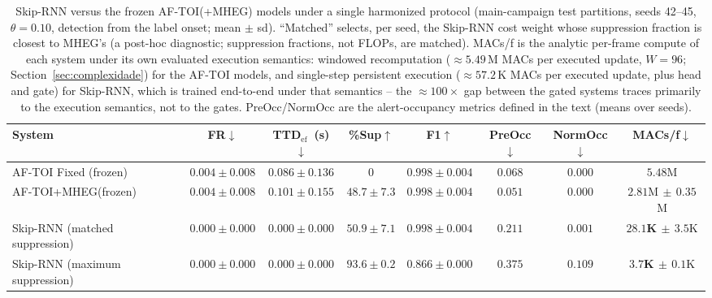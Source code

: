 \documentclass[a4paper,fleqn]{cas-dc}
\newcommand{\MHEG}{\mbox{MHEG}\xspace}
\begin{document}
{\begin{table}[!tbp]
\color{\revcolor}
\centering
\caption{Skip-RNN versus the frozen \mbox{AF-TOI}(+\MHEG) models under a
single harmonized protocol (main-campaign test partitions, seeds 42--45,
$\theta=0.10$, detection from the label onset; mean $\pm$ sd). ``Matched''
selects, per seed, the Skip-RNN cost weight whose suppression fraction is
closest to \MHEG's (a post-hoc diagnostic; suppression fractions, not FLOPs,
are matched). MACs/f is the analytic per-frame compute of each system under
its own evaluated execution semantics: windowed recomputation
(${\approx}5.49$\,M MACs per executed update, $W{=}96$;
Section~\ref{sec:complexidade}) for the \mbox{AF-TOI} models, and single-step
persistent execution (${\approx}57.2$\,K MACs per executed update, plus head
and gate) for Skip-RNN, which is trained end-to-end under that semantics --
the ${\approx}100\times$ gap between the gated systems traces primarily to
the execution semantics, not to the gates. PreOcc/NormOcc are the alert-occupancy metrics defined in the
text (means over seeds).}
\label{tab:skiprnn}
\footnotesize
\setlength{\tabcolsep}{5pt}
\renewcommand{\arraystretch}{1.2}
\begin{tabular}{l c c c c c c c}
\toprule
\textbf{System} & \textbf{FR}$\downarrow$ & \textbf{TTD$_{\mathrm{ef}}$~(s)}$\downarrow$
  & \textbf{\%Sup}$\uparrow$ & \textbf{F1}$\uparrow$
  & \textbf{PreOcc}$\downarrow$ & \textbf{NormOcc}$\downarrow$
  & \textbf{MACs/f}$\downarrow$ \\
\midrule
\mbox{AF-TOI} Fixed (frozen)   & $0.004 \pm 0.008$ & $0.086 \pm 0.136$ & $0$ & $0.998 \pm 0.004$ & $0.068$ & $\mathbf{0.000}$ & $5.48$M \\
\mbox{AF-TOI}+\MHEG (frozen)   & $0.004 \pm 0.008$ & $0.101 \pm 0.155$ & $48.7 \pm 7.3$ & $0.998 \pm 0.004$ & $\mathbf{0.051}$ & $\mathbf{0.000}$ & $2.81$M$\,\pm\,0.35$M \\
Skip-RNN (matched suppression) & $0.000 \pm 0.000$ & $0.000 \pm 0.000$ & $50.9 \pm 7.1$ & $0.998 \pm 0.004$ & $0.211$ & $0.001$ & $\mathbf{28.1}$\textbf{K}$\,\pm\,3.5$K \\
Skip-RNN (maximum suppression) & $0.000 \pm 0.000$ & $0.000 \pm 0.000$ & $93.6 \pm 0.2$ & $0.866 \pm 0.000$ & $0.375$ & $0.109$ & $\mathbf{3.7}$\textbf{K}$\,\pm\,0.1$K \\
\bottomrule
\end{tabular}
\end{table}
}
\end{document}
